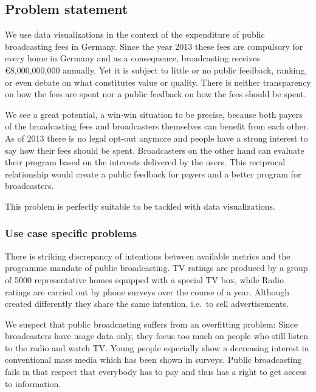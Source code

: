 \documentclass{article}
\begin{document}
\subsection{Problem statement}

We use data visualizations in the context of the expenditure of public broadcasting fees in Germany.
Since the year 2013 these fees are compulsory for every home in Germany and as a consequence, broadcasting receives €8,000,000,000 annually.
Yet it is subject to little or no public feedback, ranking, or even debate on what constitutes value or quality.
There is neither transparency on how the fees are spent nor a public feedback on how the fees should be spent.

We see a great potential, a win-win situation to be precise, because both payers of the broadcasting fees and broadcasters themselves can benefit from each other.
As of 2013 there is no legal opt-out anymore and people have a strong interest to say how their fees should be spent.
Broadcasters on the other hand can evaluate their program based on the interests delivered by the users.
This reciprocal relationship would create a public feedback for payers and a better program for broadcasters.

This problem is perfectly suitable to be tackled with data visualizations.

\subsubsection{Use case specific problems}
There is striking discrepancy of intentions between available metrics and the programme mandate of public broadcasting.
TV ratings are produced by a group of 5000 representative homes equipped with a special TV box, while Radio ratings are carried out by phone surveys over the course of a year.
Although created differently they share the same intention, i.e.\ to sell advertisements.

We suspect that public broadcasting suffers from an overfitting problem:
Since broadcasters have usage data only, they focus too much on people who still listen to the radio and watch TV.
Young people especially show a decreasing interest in conventional mass media which has been shown in surveys.
Public broadcasting fails in that respect that everybody has to pay and thus has a right to get access to information.
\end{document}
